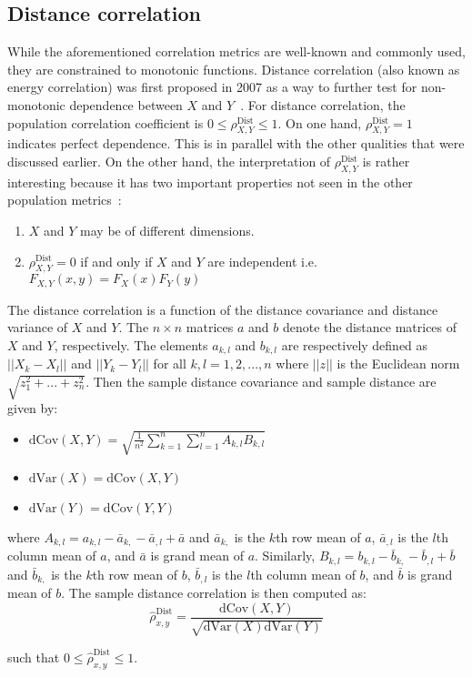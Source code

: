 \subsection{Distance correlation}

While the aforementioned correlation metrics are well-known and commonly used, 
they are constrained to monotonic functions. Distance correlation (also known 
as energy correlation) was first 
proposed in 2007 as a way to further test for non-monotonic dependence between 
$X$ and $Y$~\cite{szekely2007}. For distance correlation, the 
population correlation coefficient is $0 \leq \rho_{X,Y}^{\text{Dist}} \leq 1$. 
On one hand, 
$\rho_{X,Y}^{\text{Dist}} =1$ indicates perfect dependence. This is in parallel
with the other qualities that were discussed earlier.
On the other hand, the interpretation of 
$\rho_{X,Y}^{\text{Dist}}$ is rather interesting because it has two important 
properties not seen in the other population metrics~\cite{szekely2007}: 

\tablespacing
\begin{enumerate}
	\item $X$ and $Y$ may be of different dimensions.
	\item$\rho_{X,Y}^{\text{Dist}}=0$ if and only if $X$ and $Y$ are 
	independent i.e. $F_{X,Y}(x,y)=F_X(x)F_Y(y)$
\end{enumerate}
\bodyspacing 

The distance correlation is a function of the 
distance covariance and distance variance of $X$ and $Y$. The $n\times n$ 
matrices $a$ and $b$ denote the distance matrices of $X$ and $Y$, 
respectively. The elements $a_{k,l}$ and $b_{k,l}$ are respectively defined as 
$||X_k-X_l||$ and $||Y_k-Y_l||$ for all $k,l=1,2,...,n$ where $||z||$ is the 
Euclidean norm $\sqrt{z_1^2+...+z_n^2}$. Then the sample distance 
covariance and sample distance are given by:

\tablespacing
\begin{itemize}
	\item $\mathrm{dCov}(X,Y) = \sqrt{\frac{1}{n^2} \sum\limits_{k=1}^{n} 
	\sum\limits_{l=1}^{n} A_{k,l} B_{k,l}}$
	\item $\mathrm{dVar}(X) = \mathrm{dCov}(X,Y)$
	\item $\mathrm{dVar}(Y) = \mathrm{dCov}(Y,Y)$
\end{itemize}
\bodyspacing

\noindent where $A_{k,l}=a_{k,l}-\bar{a}_{k,}-\bar{a}_{,l}+\bar{a}$ and 
$\bar{a}_{k,}$ is the $k$th row mean of $a$, $\bar{a}_{,l}$ is the $l$th column 
mean of $a$, and $\bar{a}$ is grand mean of $a$. 
Similarly, $B_{k,l}=b_{k,l}-\bar{b}_{k,}-\bar{b}_{,l}+\bar{b}$ and 
$\bar{b}_{k,}$ is the $k$th row mean of $b$, $\bar{b}_{,l}$ is the $l$th column 
mean of $b$, and $\bar{b}$ is grand mean of $b$. The sample distance 
correlation is then computed as:
$$\hat{\rho}_{x,y}^{\text{Dist}}=\frac{\mathrm{dCov}(X,Y)}
{\sqrt{\mathrm{dVar}(X)\mathrm{dVar}(Y)}}$$

\noindent 
such that $0 \leq \hat{\rho}_{x,y}^{\text{Dist}} \leq 1$. 